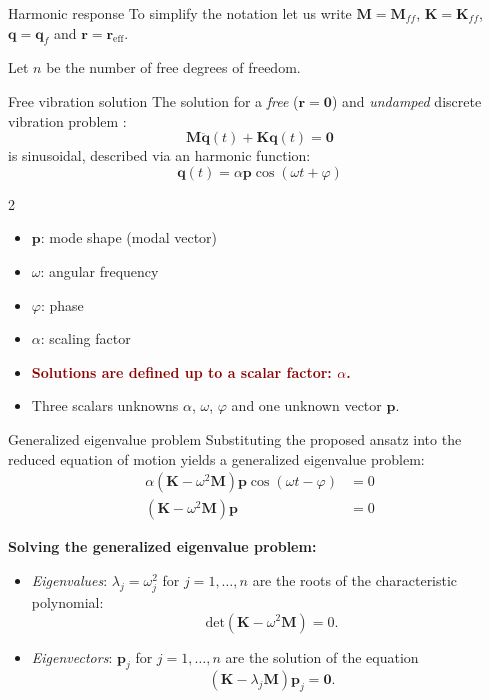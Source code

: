 \documentclass[aspectratio=169]{beamer}
\begin{document}
\begin{frame}{Harmonic response}
  \small To simplify the notation let us write $\mathbf M=\mathbf M_{ff}$, $\mathbf K=\mathbf K_{ff}$, $\mathbf q=\mathbf q_{f}$ and $\mathbf r=\mathbf r_{\mathrm{eff}}$.

  Let $n$ be the number of free degrees of freedom.
  \begin{block}{Free vibration solution}
    The solution for a \emph{free} ($\mathbf r= \mathbf 0$) and \emph{undamped} discrete vibration problem :
    $$\mathbf{M} \ddot{\mathbf{q}}(t) + \mathbf{K} \mathbf{q}(t) = \mathbf{0}$$
    is sinusoidal, described via an harmonic function:
    $$\mathbf q(t)=\alpha \mathbf p \cos(\omega t+\varphi)$$
    \begin{multicols}{2}
      \begin{itemize}
        \item \(\mathbf{p}\): mode shape (modal vector)
        \item \(\omega\): angular frequency
        \item \(\varphi\): phase
        \item \(\alpha\): scaling factor
      \end{itemize}
    \end{multicols}
  \end{block}
  \begin{itemize}
    \item  \textcolor{darkred}{\textbf{Solutions are defined up to a scalar factor: $\alpha$.}}
    \item Three scalars unknowns $\alpha$, $\omega$, $\varphi$  and one unknown vector $\mathbf{p}$.
  \end{itemize}
\end{frame}

\begin{frame}{Generalized eigenvalue problem}
  \small
  Substituting the proposed ansatz into the reduced equation of motion yields a generalized eigenvalue problem:
  \vspace{-0.2cm}
  \begin{align*}
    \alpha (\mathbf{K} - \omega^2 \mathbf{M}) \mathbf{p} \cos(\omega t - \varphi) & = 0 \\
    (\mathbf{K} - \omega^2 \mathbf{M}) \mathbf{p}                                 & = 0
  \end{align*}
  \vspace{-0.8cm}
  \begin{block}{}
    \textbf{Solving the generalized eigenvalue problem:}
    \begin{itemize}
      \item \emph{Eigenvalues}: $\lambda_j=\omega_j^2$ for $j=1,\dots,n$ are the roots of the characteristic polynomial:
            $$\text{det}(\mathbf K-\omega^2\mathbf M)=0.$$
      \item \emph{Eigenvectors}: $\mathbf p_j$ for $j=1,\dots,n$ are the solution of the equation
            $$(\mathbf{K} - \lambda_j \mathbf{M})\mathbf p_j=\mathbf 0.$$
    \end{itemize}
  \end{block}
\end{frame}
\end{document}
